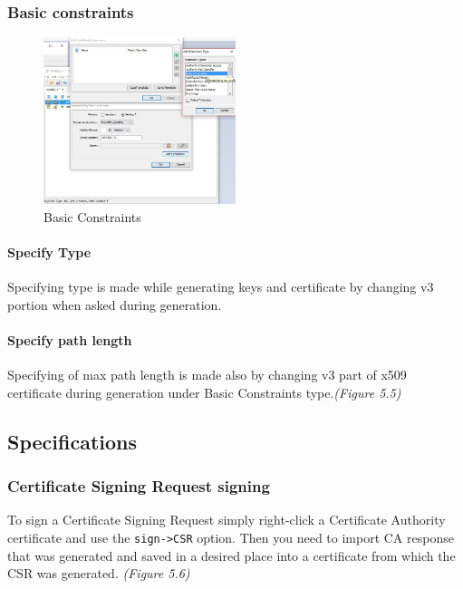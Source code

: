 \documentclass[10pt, a4paper]{report}
\begin{document}
    \subsubsection{Basic constraints}

\begin{figure}[!htbp]
 \caption{Basic Constraints}
 \centering
  \includegraphics[width=0.5\textwidth]{../Dependancies/Keystore_Explorer/Basic_Constraints.jpg}
\end{figure}

      \paragraph{Specify Type}
Specifying type is made while generating keys and certificate by changing v3 portion when asked during generation.

      \paragraph{Specify path length}
Specifying of max path length is made also by changing v3 part of x509 certificate during generation under Basic Constraints type.\textit{(Figure 5.5)}

  \subsection{Specifications}
  
    \subsubsection{Certificate Signing Request signing}
To sign a Certificate Signing Request simply right-click a Certificate Authority certificate and use the \verb+sign->CSR+ option. Then you need to import CA response that was generated and saved in a desired place into a certificate from which the CSR was generated. \textit{(Figure 5.6)}
\end{document}
